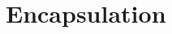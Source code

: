 \documentclass[../main.tex]{subfiles}
\begin{document}
    \section{Encapsulation}
    
\end{document}
